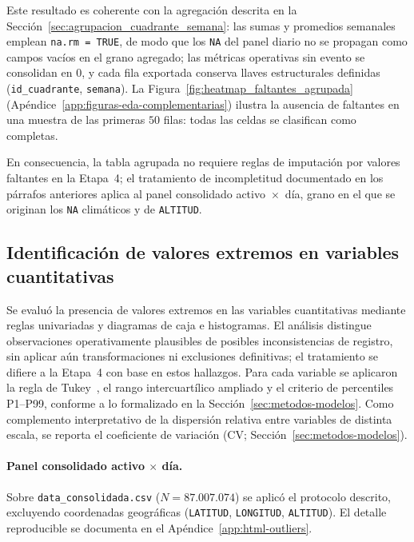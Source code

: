     Este resultado es coherente con la agregación descrita en la Sección~\ref{sec:agrupacion_cuadrante_semana}: las sumas y promedios semanales emplean \texttt{na.rm = TRUE}, de modo que los \texttt{NA} del panel diario no se propagan como campos vacíos en el grano agregado; las métricas operativas sin evento se consolidan en $0$, y cada fila exportada conserva llaves estructurales definidas (\texttt{id\_cuadrante}, \texttt{semana}). La Figura~\ref{fig:heatmap_faltantes_agrupada} (Apéndice~\ref{app:figuras-eda-complementarias}) ilustra la ausencia de faltantes en una muestra de las primeras $50$ filas: todas las celdas se clasifican como completas.
    
    \noindent En consecuencia, la tabla agrupada no requiere reglas de imputación por valores faltantes en la Etapa~4; el tratamiento de incompletitud documentado en los párrafos anteriores aplica al panel consolidado activo~$\times$~día, grano en el que se originan los \texttt{NA} climáticos y de \texttt{ALTITUD}.
    
\subsection{Identificación de valores extremos en variables cuantitativas}
\label{sec:identificacion_valores_extremos}
    Se evaluó la presencia de valores extremos en las variables cuantitativas mediante reglas univariadas y diagramas de caja e histogramas. El análisis distingue observaciones operativamente plausibles de posibles inconsistencias de registro, sin aplicar aún transformaciones ni exclusiones definitivas; el tratamiento se difiere a la Etapa~4 con base en estos hallazgos. Para cada variable se aplicaron la regla de Tukey~\textcite{ref50}, el rango intercuartílico ampliado y el criterio de percentiles P1--P99, conforme a lo formalizado en la Sección~\ref{sec:metodos-modelos}. Como complemento interpretativo de la dispersión relativa entre variables de distinta escala, se reporta el coeficiente de variación (CV; Sección~\ref{sec:metodos-modelos}).
    
    \paragraph{Panel consolidado activo $\times$ día.} Sobre \texttt{data\_consolidada.csv} ($N = 87{.}007{.}074$) se aplicó el protocolo descrito, excluyendo coordenadas geográficas (\texttt{LATITUD}, \texttt{LONGITUD}, \texttt{ALTITUD}). El detalle reproducible se documenta en el Apéndice~\ref{app:html-outliers}.
    

